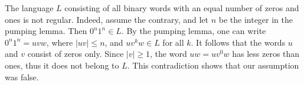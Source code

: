 

\setcounter{section}{3}
\setcounter{subsection}{2}
\setcounter{dfn}{5}

\begin{exl}
The language $L$ consisting of all binary words with an equal number of zeros and ones is not regular.
Indeed, assume the contrary, and let $n$ be the integer in the pumping lemma.
Then $0^n1^n \in L$.
By the pumping lemma, one can write $0^n1^n = uvw$, where $|uv| \le n$, and $uv^kw \in L$ for all $k$.
It follows that the words $u$ and $v$ consist of zeros only.
Since $|v| \ge 1$, the word $uw = uv^0w$ has less zeros than ones, thus it does not belong to $L$.
This contradiction shows that our assumption was false.
\end{exl}


